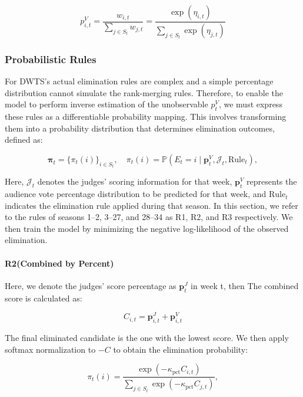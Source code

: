 \documentclass[12pt]{article}
\begin{document}
\begin{equation}
  p_{i,t}^V = \frac{w_{i,t}}{\sum_{j \in S_t} w_{j,t}} = \frac{\exp(\eta_{i,t})}{\sum_{j \in S_t} \exp(\eta_{j,t})}
\end{equation}

\subsubsection{Probabilistic Rules}

For DWTS's actual elimination rules are complex and a simple percentage distribution cannot simulate the rank-merging rules. Therefore, to enable the model to perform inverse estimation of the unobservable $p_t^V$, we must express these rules as a differentiable probability mapping. This involves transforming them into a probability distribution that determines elimination outcomes, defined as:

\begin{equation}
  \boldsymbol{\pi}_t = \{\pi_t(i)\}_{i \in S_t}, \quad \pi_t(i) = \mathbb{P}(E_t = i \mid \mathbf{p}_t^V, \mathcal{J}_t, \text{Rule}_t),
\end{equation}

Here, $\mathcal{J}_t$ denotes the judges' scoring information for that week, $\mathbf{p}_t^V$ represents the audience vote percentage distribution to be predicted for that week, and $\text{Rule}_t$ indicates the elimination rule applied during that season. In this section, we refer to the rules of seasons 1–2, 3–27, and 28–34 as R1, R2, and R3 respectively. We then train the model by minimizing the negative log-likelihood of the observed elimination.

\paragraph{R2(Combined by Percent)}

Here, we denote the judges' score percentage as $\mathbf{p}_t^J$ in week t, then The combined score is calculated as:

\begin{equation}
  C_{i,t} = \mathbf{p}_{i,t}^J + \mathbf{p}_{i,t}^V
\end{equation}

The final eliminated candidate is the one with the lowest score. We then apply softmax normalization to $-C$ to obtain the elimination probability:

\begin{equation}
  \pi_t(i) = \frac{\exp \left( -\kappa_{\text{pct}} C_{i,t} \right)}{\sum_{j \in S_t} \exp \left( -\kappa_{\text{pct}} C_{j,t} \right)},
\end{equation}
\end{document}
